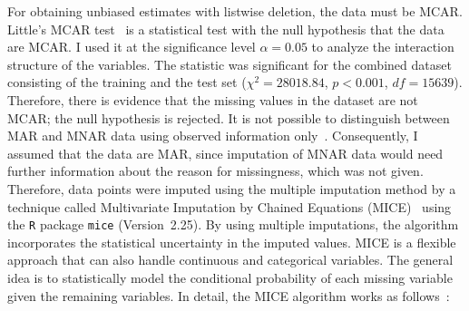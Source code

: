 \documentclass[a4paper,11pt]{article}
\begin{document}
For obtaining unbiased estimates with listwise deletion, the data must
be MCAR. Little's MCAR test~\cite{little1988test} is a statistical
test with the null hypothesis that the data are MCAR. I used it at the
significance level $\alpha=0.05$ to analyze the interaction structure
of the variables. The statistic was significant for the combined
dataset consisting of the training and the test set
($\chi^2 = 28018.84$, $p < 0.001$, $df=15639$). Therefore, there is
evidence that the missing values in the dataset are not MCAR; the null
hypothesis is rejected. It is not possible to distinguish between MAR
and MNAR data using observed information
only~\cite{sterne2009multiple}. Consequently, I assumed that the data
are MAR, since imputation of MNAR data would need further information
about the reason for missingness, which was not given.  Therefore,
data points were imputed using the multiple imputation method by a
technique called Multivariate Imputation by Chained Equations
(MICE)~\cite{buuren2011mice} using the \texttt{R} package
\texttt{mice} (Version~2.25). By using multiple imputations, the
algorithm incorporates the statistical uncertainty in the imputed
values. MICE is a flexible approach that can also handle continuous
and categorical variables. The general idea is to statistically model
the conditional probability of each missing variable given the
remaining variables. In detail, the MICE algorithm works as
follows~\cite{buuren2011mice,azur2011multiple}:
\end{document}
